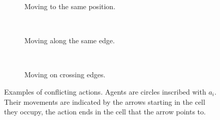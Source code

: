 \begin{figure}[t]
    \centering
    \begin{subfigure}[b]{.25\textwidth}
        \centering
        \def\svgscale{.55}
        
        \caption{Moving to the same position.}
        \label{fig:conflict-position}
    \end{subfigure}
    ~    
    \begin{subfigure}[b]{.25\textwidth}
        \centering
        \def\svgscale{.55}
        
        \caption{Moving along the same edge.}
        \label{fig:conflict-same}
    \end{subfigure}
    ~
    \begin{subfigure}[b]{.25\textwidth}
        \centering
        \def\svgscale{.55}
        
        \caption{Moving on crossing edges.}
        \label{fig:conflict-crossing}
    \end{subfigure}
    \caption{Examples of conflicting actions. Agents are circles inscribed with
        $a_i$. Their movements are indicated by the arrows starting in the cell
        they occupy, the action ends in the cell that the arrow points to.}
    \label{fig:conflicts}
\end{figure}